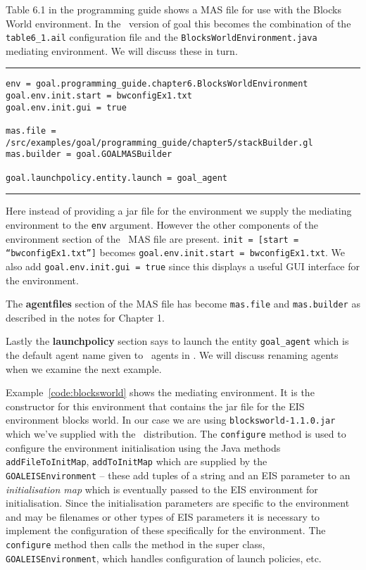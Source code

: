 \documentclass[a4]{article}
\begin{document}
Table 6.1 in the programming guide shows a MAS file for use with the Blocks World environment.  In the \ail\ version of goal this becomes the combination of the \texttt{table6\_1.ail} configuration file and the \texttt{BlocksWorldEnvironment.java} mediating environment.  We will discuss these in turn.

\noindent\rule{\textwidth}{1pt}
\begin{small}
\begin{verbatim}
env = goal.programming_guide.chapter6.BlocksWorldEnvironment
goal.env.init.start = bwconfigEx1.txt
goal.env.init.gui = true

mas.file = /src/examples/goal/programming_guide/chapter5/stackBuilder.gl
mas.builder = goal.GOALMASBuilder

goal.launchpolicy.entity.launch = goal_agent
\end{verbatim}
\end{small}
\rule{\textwidth}{1pt}

Here instead of providing a jar file for the environment we supply the mediating environment to the \texttt{env} argument.  However the other components of the environment section of the \goal\ MAS file are present.  \texttt{init = [start = ``bwconfigEx1.txt'']} becomes \texttt{goal.env.init.start = bwconfigEx1.txt}.  We also add \texttt{goal.env.init.gui = true} since this displays a useful GUI interface for the environment.

The {\bf agentfiles} section of the MAS file has become \texttt{mas.file} and \texttt{mas.builder} as described in the notes for Chapter 1.

Lastly the {\bf launchpolicy} section says to launch the entity \texttt{goal\_agent} which is the default agent name given to \goal\ agents in \ail.  We will discuss renaming agents when we examine the next example.

Example~\ref{code:blocksworld} shows the mediating environment.  It is the constructor for this environment that contains the jar file for the EIS environment blocks world.  In our case we are using \texttt{blocksworld-1.1.0.jar} which we've supplied with the \mcapl\ distribution.  The \texttt{configure} method is used to configure the environment initialisation using the Java methods \texttt{addFileToInitMap}, \texttt{addToInitMap} which are supplied by the \texttt{GOALEISEnvironment} -- these add tuples of a string and an EIS parameter to an \emph{initialisation map} which is eventually passed to the EIS environment for initialisation.  Since the initialisation parameters are specific to the environment and may be filenames or other types of EIS parameters it is necessary to implement the configuration of these specifically for the environment.  The \texttt{configure} method then calls the method in the super class, \texttt{GOALEISEnvironment}, which handles configuration of launch policies, etc.
\end{document}
